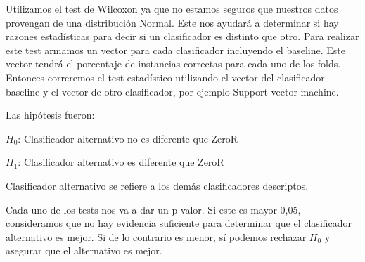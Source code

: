 Utilizamos el test de Wilcoxon ya que no estamos seguros que nuestros datos provengan de una distribución Normal. Este nos ayudará a determinar si hay razones estadísticas para decir si un clasificador es distinto que otro. Para realizar este test armamos un vector para cada clasificador incluyendo el baseline. Este vector tendrá el porcentaje de instancias correctas para cada uno de los folds. Entonces correremos el test estadístico utilizando el vector del clasificador baseline y el vector de otro clasificador, por ejemplo Support vector machine.

%
%	

Las hipótesis fueron:

\vspace{0.5cm}
\hspace{2cm}$H_0$: Clasificador alternativo no es diferente que ZeroR
\vspace{0.25cm}

\hspace{2cm}$H_1$: Clasificador alternativo es diferente que ZeroR
\vspace{0.5cm}

Clasificador alternativo se refiere a los demás clasificadores descriptos. 

Cada uno de los tests nos va a dar un p-valor. Si este es mayor 0,05, consideramos que no hay evidencia suficiente para determinar que el clasificador alternativo es mejor. Si de lo contrario es menor, sí podemos rechazar $H_0$ y asegurar que el alternativo es mejor. 

